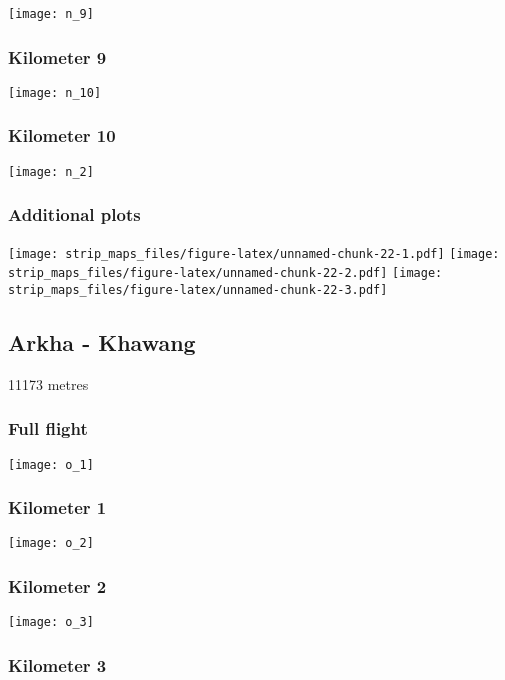 \documentclass[]{article}
\begin{document}
\texttt{[image: n\_9]}

\subsubsection{Kilometer 9}\label{kilometer-9-2}

\texttt{[image: n\_10]}

\subsubsection{Kilometer 10}\label{kilometer-10-2}

\texttt{[image: n\_2]}

\subsubsection{Additional plots}\label{additional-plots-13}

\texttt{[image: strip\_maps\_files/figure-latex/unnamed-chunk-22-1.pdf]}
\texttt{[image: strip\_maps\_files/figure-latex/unnamed-chunk-22-2.pdf]}
\texttt{[image: strip\_maps\_files/figure-latex/unnamed-chunk-22-3.pdf]}

\newpage

\subsection{Arkha - Khawang}\label{arkha---khawang}

11173 metres

\subsubsection{Full flight}\label{full-flight-14}

\texttt{[image: o\_1]}

\subsubsection{Kilometer 1}\label{kilometer-1-14}

\texttt{[image: o\_2]}

\subsubsection{Kilometer 2}\label{kilometer-2-14}

\texttt{[image: o\_3]}

\subsubsection{Kilometer 3}\label{kilometer-3-14}
\end{document}
